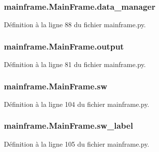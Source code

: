 \subsubsection[{data\+\_\+manager}]{\setlength{\rightskip}{0pt plus 5cm}mainframe.\+Main\+Frame.\+data\+\_\+manager}\label{classmainframe_1_1_main_frame_a2ea855c763e8591d4a828656f75ef6f1}


Définition à la ligne 88 du fichier mainframe.\+py.

\hypertarget{classmainframe_1_1_main_frame_a0efaec7fc32e3ba7fd3bbf5091d00610}{}
\subsubsection[{output}]{\setlength{\rightskip}{0pt plus 5cm}mainframe.\+Main\+Frame.\+output}\label{classmainframe_1_1_main_frame_a0efaec7fc32e3ba7fd3bbf5091d00610}


Définition à la ligne 81 du fichier mainframe.\+py.

\hypertarget{classmainframe_1_1_main_frame_a054a0dcce14082157c43b37263189d07}{}
\subsubsection[{sw}]{\setlength{\rightskip}{0pt plus 5cm}mainframe.\+Main\+Frame.\+sw}\label{classmainframe_1_1_main_frame_a054a0dcce14082157c43b37263189d07}


Définition à la ligne 104 du fichier mainframe.\+py.

\hypertarget{classmainframe_1_1_main_frame_aef0c9dcafcd1e785dac074526d0cb8f1}{}
\subsubsection[{sw\+\_\+label}]{\setlength{\rightskip}{0pt plus 5cm}mainframe.\+Main\+Frame.\+sw\+\_\+label}\label{classmainframe_1_1_main_frame_aef0c9dcafcd1e785dac074526d0cb8f1}


Définition à la ligne 105 du fichier mainframe.\+py.


